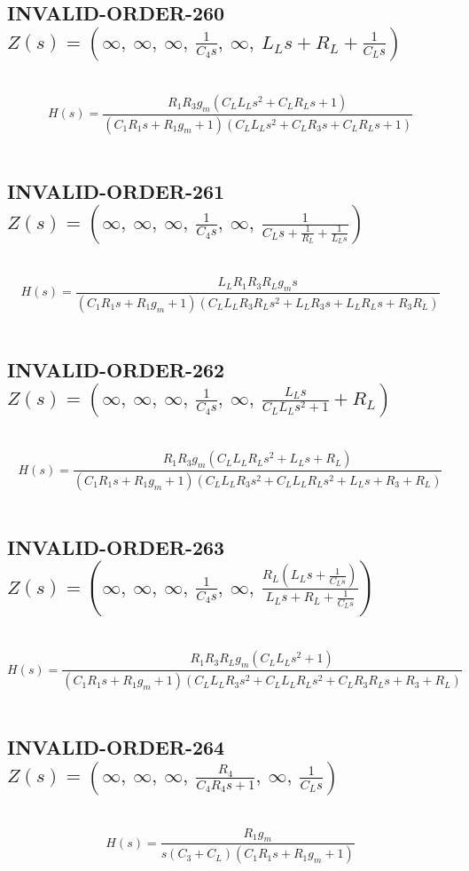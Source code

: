 \documentclass{article}
\begin{document}
\subsection{INVALID-ORDER-260 $Z(s) = \left( \infty, \  \infty, \  \infty, \  \frac{1}{C_{4} s}, \  \infty, \  L_{L} s + R_{L} + \frac{1}{C_{L} s}\right)$ } \ 
\textbf{\[H(s) = \frac{R_{1} R_{3} g_{m} \left(C_{L} L_{L} s^{2} + C_{L} R_{L} s + 1\right)}{\left(C_{1} R_{1} s + R_{1} g_{m} + 1\right) \left(C_{L} L_{L} s^{2} + C_{L} R_{3} s + C_{L} R_{L} s + 1\right)}\] } \ 
\subsection{INVALID-ORDER-261 $Z(s) = \left( \infty, \  \infty, \  \infty, \  \frac{1}{C_{4} s}, \  \infty, \  \frac{1}{C_{L} s + \frac{1}{R_{L}} + \frac{1}{L_{L} s}}\right)$ } \ 
\textbf{\[H(s) = \frac{L_{L} R_{1} R_{3} R_{L} g_{m} s}{\left(C_{1} R_{1} s + R_{1} g_{m} + 1\right) \left(C_{L} L_{L} R_{3} R_{L} s^{2} + L_{L} R_{3} s + L_{L} R_{L} s + R_{3} R_{L}\right)}\] } \ 
\subsection{INVALID-ORDER-262 $Z(s) = \left( \infty, \  \infty, \  \infty, \  \frac{1}{C_{4} s}, \  \infty, \  \frac{L_{L} s}{C_{L} L_{L} s^{2} + 1} + R_{L}\right)$ } \ 
\textbf{\[H(s) = \frac{R_{1} R_{3} g_{m} \left(C_{L} L_{L} R_{L} s^{2} + L_{L} s + R_{L}\right)}{\left(C_{1} R_{1} s + R_{1} g_{m} + 1\right) \left(C_{L} L_{L} R_{3} s^{2} + C_{L} L_{L} R_{L} s^{2} + L_{L} s + R_{3} + R_{L}\right)}\] } \ 
\subsection{INVALID-ORDER-263 $Z(s) = \left( \infty, \  \infty, \  \infty, \  \frac{1}{C_{4} s}, \  \infty, \  \frac{R_{L} \left(L_{L} s + \frac{1}{C_{L} s}\right)}{L_{L} s + R_{L} + \frac{1}{C_{L} s}}\right)$ } \ 
\textbf{\[H(s) = \frac{R_{1} R_{3} R_{L} g_{m} \left(C_{L} L_{L} s^{2} + 1\right)}{\left(C_{1} R_{1} s + R_{1} g_{m} + 1\right) \left(C_{L} L_{L} R_{3} s^{2} + C_{L} L_{L} R_{L} s^{2} + C_{L} R_{3} R_{L} s + R_{3} + R_{L}\right)}\] } \ 
\subsection{INVALID-ORDER-264 $Z(s) = \left( \infty, \  \infty, \  \infty, \  \frac{R_{4}}{C_{4} R_{4} s + 1}, \  \infty, \  \frac{1}{C_{L} s}\right)$ } \ 
\textbf{\[H(s) = \frac{R_{1} g_{m}}{s \left(C_{3} + C_{L}\right) \left(C_{1} R_{1} s + R_{1} g_{m} + 1\right)}\] } \ 
\end{document}
